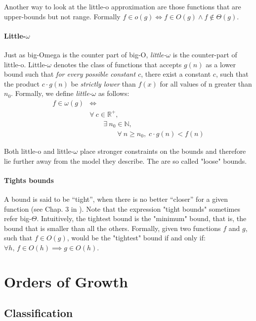 \documentclass{aldast}
\begin{document}
Another way to look at the little-o approximation are those functions
that are upper-bounds but not range. Formally
$f\in o(g) \iff f \in O(g) \land f \not\in \Theta(g)$.
          
\paragraph{Little-$\omega$} Just as big-Omega is the counter part of
big-O, \emph{little-$\omega$} is the counter-part of
little-o. Little-$\omega$ denotes the class of functions that accepts
$g(n)$ as a lower bound such that \emph{for every possible constant
  $c$}, there exist a constant $c$, such that the product
$c \cdot g(n)$ be \emph{strictly lower} than $f(x)$ for all values of
n greater than $n_0$. Formally, we define \emph{little-$\omega$} as
follows:
\begin{equation*}
  \begin{split}
    f \in \omega(g) & \iff \\
    & \forall \: c \in \mathbb{R}^+, \\
    & \qquad \exists \: n_0 \in \mathbb{N}, \\
    & \qquad \qquad \forall \: n \geq n_0, \;  c \cdot g(n) < f(n)
  \end{split}
\end{equation*}

Both little-o and little-$\omega$ place stronger constraints on the
bounds and therefore lie further away from the model they
describe. The are so called "loose" bounds.

\paragraph{Tights bounds} A bound is said to be ``tight'', when there is
no better ``closer'' for a given function (see Chap. 3 in
\cite{preiss2008}). Note that the expression "tight bounds"
sometimes refer big-$\Theta$.  Intuitively, the tightest bound is the
"minimum" bound, that is, the bound that is smaller than all the
others. Formally, given two functions $f$ and $g$, such that
$f \in O(g)$, would be the "tightest" bound if and only if:
$\forall h, \, f \in O(h) \implies g \in O(h)$.

\section{Orders of Growth}

\subsection{Classification}
\end{document}
